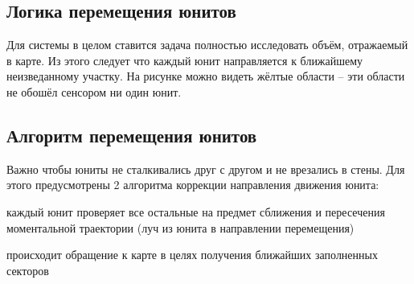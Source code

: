 \subsection{Логика перемещения юнитов}

Для системы в целом ставится задача полностью исследовать объём, отражаемый в карте.
Из этого следует что каждый юнит направляется к ближайшему неизведанному участку. 
На рисунке можно видеть жёлтые области -- эти области не обошёл сенсором ни один юнит.

\subsection{Алгоритм перемещения юнитов}

Важно чтобы юниты не сталкивались друг с другом и не врезались в стены.
Для этого предусмотрены 2 алгоритма коррекции направления движения юнита: 
\begin{mintemize}
    \item каждый юнит проверяет все остальные на предмет сближения и пересечения моментальной траектории
            (луч из юнита в направлении перемещения)
    \item происходит обращение к карте в целях получения ближайших заполненных секторов
\end{mintemize}


